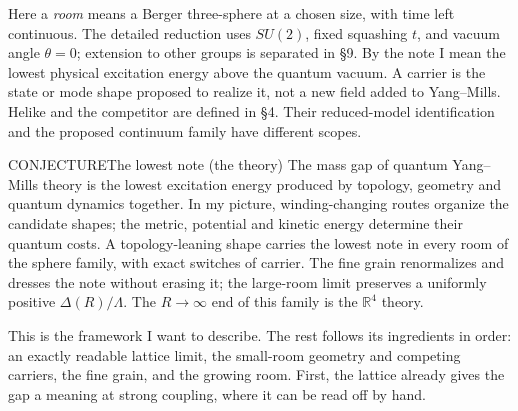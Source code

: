Here a \emph{room} means a Berger three-sphere at a chosen size, with time left continuous. The detailed reduction
uses $SU(2)$, fixed squashing $t$, and vacuum angle $\theta=0$; extension to other groups is separated in \S9.
By the note I mean the lowest physical excitation energy above the quantum vacuum. A carrier is the state or mode
shape proposed to realize it, not a new field added to Yang--Mills. Helike and the competitor are defined
in \S4. Their reduced-model identification and the proposed continuum family have different scopes.

\begin{claim}{CONJECTURE}{The lowest note (the theory)}\label{b:theory}
The mass gap of quantum Yang--Mills theory is the lowest excitation energy produced by topology, geometry and quantum
dynamics together. In my picture, winding-changing routes organize the candidate shapes; the metric, potential and
kinetic energy determine their quantum costs. A topology-leaning shape carries the lowest note in every room of the
sphere family, with exact switches of carrier. The fine grain renormalizes and
dresses the note without erasing it; the large-room limit preserves a uniformly positive $\Delta(R)/\Lambda$.
The $R\to\infty$ end of this family is the $\mathbb R^4$ theory.
\end{claim}

This is the framework I want to describe. The rest follows its ingredients in order: an exactly readable lattice
limit, the small-room geometry and competing carriers, the fine grain, and the growing room.
First, the lattice already gives the gap a meaning at strong coupling, where it can be read off by hand.
